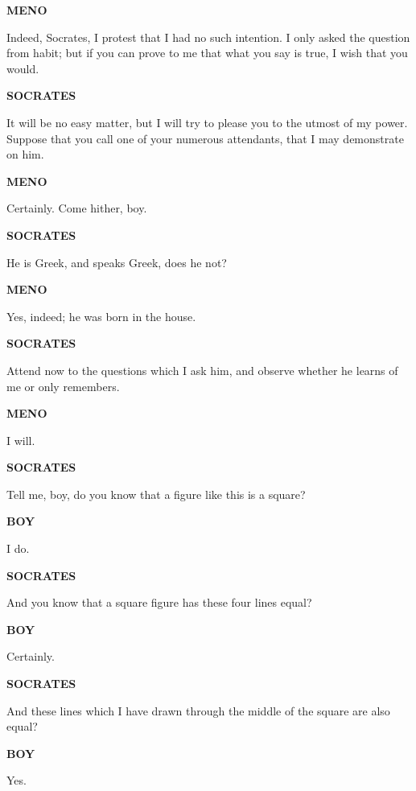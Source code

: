 \documentclass[11pt,letter]{article}
\begin{document}
\par \textbf{MENO}
\par   Indeed, Socrates, I protest that I had no such intention. I only asked the question from habit; but if you can prove to me that what you say is true, I wish that you would.

\par \textbf{SOCRATES}
\par   It will be no easy matter, but I will try to please you to the utmost of my power. Suppose that you call one of your numerous attendants, that I may demonstrate on him.

\par \textbf{MENO}
\par   Certainly. Come hither, boy.

\par \textbf{SOCRATES}
\par   He is Greek, and speaks Greek, does he not?

\par \textbf{MENO}
\par   Yes, indeed; he was born in the house.

\par \textbf{SOCRATES}
\par   Attend now to the questions which I ask him, and observe whether he learns of me or only remembers.

\par \textbf{MENO}
\par   I will.

\par \textbf{SOCRATES}
\par   Tell me, boy, do you know that a figure like this is a square?

\par \textbf{BOY}
\par   I do.

\par \textbf{SOCRATES}
\par   And you know that a square figure has these four lines equal?

\par \textbf{BOY}
\par   Certainly.

\par \textbf{SOCRATES}
\par   And these lines which I have drawn through the middle of the square are also equal?

\par \textbf{BOY}
\par   Yes.
\end{document}
